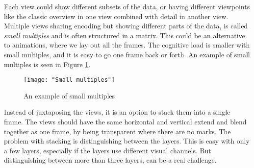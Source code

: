 \documentclass[Report.tex]{subfiles}
\begin{document}
Each view could show different subsets of the data, or having different viewpoints like the classic overview in one view  combined with detail in another view. 
Multiple views sharing encoding but showing different parts of the data, is called \emph{small multiples} and is often structured in a matrix. This could be an alternative to animations, where we lay out all the frames. The cognitive load is smaller with small multiples, and it is easy to go one frame back or forth. An example of small multiples is seen in Figure \ref{fig:smallmultiples}.
\begin{figure}
\center
\texttt{[image: "Small multiples"]}
\caption{An example of small multiples}
\label{fig:smallmultiples}
\end{figure}
Instead of juxtaposing the views, it is an option to stack them into a single frame. The views should have the same horizontal and vertical extend and blend together as one frame, by being transparent where there are no marks. The problem with stacking is distinguishing between the layers. This is easy with only a few layers, especially if the layers use different visual channels. But distinguishing between more than three layers, can be a real challenge. \cite[Chapter 12]{Tamara}
\end{document}
